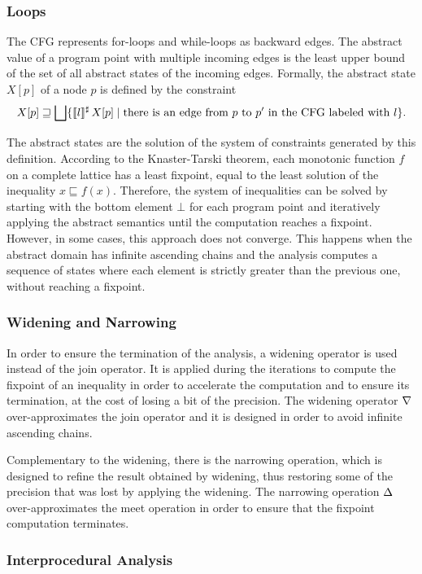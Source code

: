 \subsubsection{Loops}
The CFG represents for-loops and while-loops as backward edges.
The abstract value of a program point with multiple incoming edges is
the least upper bound of the set of all abstract states of the incoming edges.
Formally, the abstract state $X[p]$ of a node $p$ is defined by the constraint
\[
 X[p] \sqsupseteq \bigsqcup \{\llbracket l\rrbracket^\sharp\,X[p] \mid \text{there is an edge from $p$ to $p'$ in the CFG labeled with $l$}\}.
\]

The abstract states are the solution of the system of constraints generated by this definition.
According to the Knaster-Tarski theorem, each monotonic function $f$ on a complete lattice has a least fixpoint, equal to the least solution of the inequality $x \sqsubseteq f(x)$.
Therefore, the system of inequalities can be solved by starting with the bottom element $\bot$ for each program point and iteratively applying the abstract semantics until the computation reaches a fixpoint.
However, in some cases, this approach does not converge.
This happens when the abstract domain has infinite ascending chains and the analysis computes a sequence of states where each element is strictly greater than the previous one, without reaching a fixpoint.
\subsubsection{Widening and Narrowing}

In order to ensure the termination of the analysis, a widening operator is used instead of the
join operator. It is applied during the iterations to compute the fixpoint of an inequality
in order to accelerate the computation and to ensure its termination, at the cost of losing a bit of the precision.
The widening operator $\nabla$ over-approximates the join operator and it is designed in order to avoid infinite ascending chains.

Complementary to the widening, there is the narrowing operation, which is designed to
refine the result obtained by widening, thus restoring some of the precision that was lost by applying the widening.
The narrowing operation $\Delta$ over-approximates the meet operation in order to ensure that the fixpoint computation terminates.

\subsubsection{Interprocedural Analysis}

